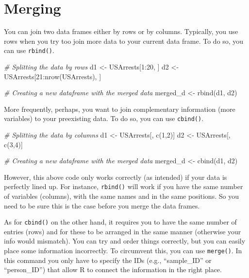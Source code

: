 \documentclass[
]{book}
\newenvironment{Shaded}{\begin{snugshade}}{\end{snugshade}}
\newcommand{\CommentTok}[1]{\textcolor[rgb]{0.56,0.35,0.01}{\textit{#1}}}
\newcommand{\DecValTok}[1]{\textcolor[rgb]{0.00,0.00,0.81}{#1}}
\newcommand{\FunctionTok}[1]{\textcolor[rgb]{0.00,0.00,0.00}{#1}}
\newcommand{\NormalTok}[1]{#1}
\newcommand{\OtherTok}[1]{\textcolor[rgb]{0.56,0.35,0.01}{#1}}
\newcommand{\SpecialCharTok}[1]{\textcolor[rgb]{0.00,0.00,0.00}{#1}}
\begin{document}
\hypertarget{merging}{%
\section{Merging}\label{merging}}

You can join two data frames either by rows or by columns.
Typically, you use rows when you try too join more data to your current data frame.
To do so, you can use \texttt{rbind()}.

\begin{Shaded}
\begin{Highlighting}[]
\CommentTok{\# Splitting the data by rows}
\NormalTok{d1 }\OtherTok{\textless{}{-}}\NormalTok{ USArrests[}\DecValTok{1}\SpecialCharTok{:}\DecValTok{20}\NormalTok{, ]}
\NormalTok{d2 }\OtherTok{\textless{}{-}}\NormalTok{ USArrests[}\DecValTok{21}\SpecialCharTok{:}\FunctionTok{nrow}\NormalTok{(USArrests), ]}

\CommentTok{\# Creating a new dataframe with the merged data}
\NormalTok{merged\_d }\OtherTok{\textless{}{-}} \FunctionTok{rbind}\NormalTok{(d1, d2)}
\end{Highlighting}
\end{Shaded}

More frequently, perhaps, you want to join complementary information (more variables) to your preexisting data.
To do so, you can use \texttt{cbind()}.

\begin{Shaded}
\begin{Highlighting}[]
\CommentTok{\# Splitting the data by columns}
\NormalTok{d1 }\OtherTok{\textless{}{-}}\NormalTok{ USArrests[, }\FunctionTok{c}\NormalTok{(}\DecValTok{1}\NormalTok{,}\DecValTok{2}\NormalTok{)]}
\NormalTok{d2 }\OtherTok{\textless{}{-}}\NormalTok{ USArrests[, }\FunctionTok{c}\NormalTok{(}\DecValTok{3}\NormalTok{,}\DecValTok{4}\NormalTok{)]}

\CommentTok{\# Creating a new dataframe with the merged data}
\NormalTok{merged\_d }\OtherTok{\textless{}{-}} \FunctionTok{cbind}\NormalTok{(d1, d2)}
\end{Highlighting}
\end{Shaded}

However, this above code only works correctly (as intended) if your data is perfectly lined up.
For instance, \texttt{rbind()} will work if you have the same number of variables (columns), with the same names and in the same positions.
So you need to be sure this is the case before you merge the data frames.

As for \texttt{cbind()} on the other hand, it requires you to have the same number of entries (rows) and for these to be arranged in the same manner (otherwise your info would mismatch).
You can try and order things correctly, but you can easily place some information incorrectly.
To circumvent this, you can use \texttt{merge()}.
In this command you only have to specify the IDs (e.g., ``sample\_ID'' or ``person\_ID'') that allow R to connect the information in the right place.
\end{document}
